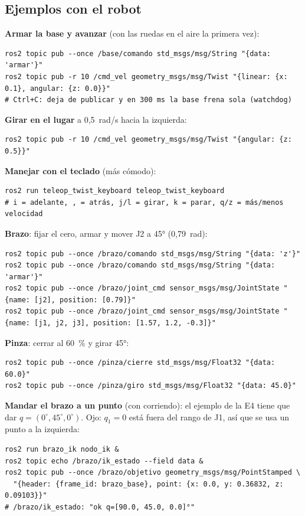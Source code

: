 \subsection{Ejemplos con el robot}

\textbf{Armar la base y avanzar} (con las ruedas en el aire la primera vez):
\begin{lstlisting}[language=consola]
ros2 topic pub --once /base/comando std_msgs/msg/String "{data: 'armar'}"
ros2 topic pub -r 10 /cmd_vel geometry_msgs/msg/Twist "{linear: {x: 0.1}, angular: {z: 0.0}}"
# Ctrl+C: deja de publicar y en 300 ms la base frena sola (watchdog)
\end{lstlisting}

\textbf{Girar en el lugar} a 0,5~rad/s hacia la izquierda:
\begin{lstlisting}[language=consola]
ros2 topic pub -r 10 /cmd_vel geometry_msgs/msg/Twist "{angular: {z: 0.5}}"
\end{lstlisting}

\textbf{Manejar con el teclado} (más cómodo):
\begin{lstlisting}[language=consola]
ros2 run teleop_twist_keyboard teleop_twist_keyboard
# i = adelante, , = atrás, j/l = girar, k = parar, q/z = más/menos velocidad
\end{lstlisting}

\textbf{Brazo}: fijar el cero, armar y mover J2 a 45° (0,79~rad):
\begin{lstlisting}[language=consola]
ros2 topic pub --once /brazo/comando std_msgs/msg/String "{data: 'z'}"
ros2 topic pub --once /brazo/comando std_msgs/msg/String "{data: 'armar'}"
ros2 topic pub --once /brazo/joint_cmd sensor_msgs/msg/JointState "{name: [j2], position: [0.79]}"
ros2 topic pub --once /brazo/joint_cmd sensor_msgs/msg/JointState "{name: [j1, j2, j3], position: [1.57, 1.2, -0.3]}"
\end{lstlisting}

\textbf{Pinza}: cerrar al 60~\% y girar 45°:
\begin{lstlisting}[language=consola]
ros2 topic pub --once /pinza/cierre std_msgs/msg/Float32 "{data: 60.0}"
ros2 topic pub --once /pinza/giro std_msgs/msg/Float32 "{data: 45.0}"
\end{lstlisting}

\textbf{Mandar el brazo a un punto} (con  corriendo): el ejemplo de la E4 tiene que dar
$q = (0^\circ, 45^\circ, 0^\circ)$. Ojo: $q_1 = 0$ está fuera del rango de J1, así que se usa un punto a la izquierda:
\begin{lstlisting}[language=consola]
ros2 run brazo_ik nodo_ik &
ros2 topic echo /brazo/ik_estado --field data &
ros2 topic pub --once /brazo/objetivo geometry_msgs/msg/PointStamped \
  "{header: {frame_id: brazo_base}, point: {x: 0.0, y: 0.36832, z: 0.09103}}"
# /brazo/ik_estado: "ok q=[90.0, 45.0, 0.0]°"
\end{lstlisting}

